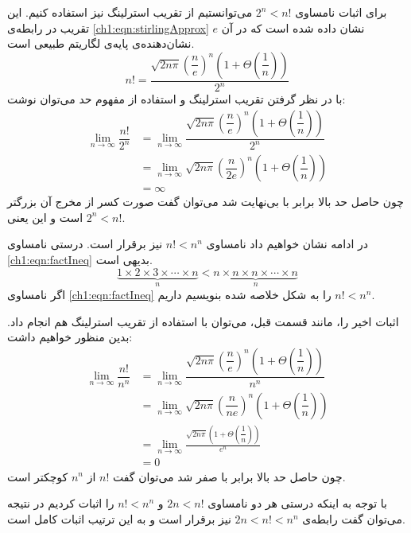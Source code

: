 برای اثبات نامساوی {$2^n < n!$} می‌توانستیم از تقریب استرلینگ نیز استفاده کنیم. این تقریب در رابطه‌ی {\eqref{ch1:eqn:stirlingApprox}} نشان داده شده است که در آن {$e$} نشان‌دهنده‌ی پایه‌ی لگاریتم طبیعی است.
\begin{equation}
n! = \dfrac{\sqrt{2n\pi}{\left( \dfrac{n}{e}\right)}^n\left( 1+\Theta\left(\dfrac{1}{n}\right)\right)}{2^n}\label{ch1:eqn:stirlingApprox}
\end{equation}
با در نظر گرفتن تقریب استرلینگ و استفاده از مفهوم حد می‌توان نوشت:
\begin{align*}
\lim_{n\to \infty} {\dfrac{n!}{2^n}} &=\lim_{n\to \infty}{\dfrac{\sqrt{2n\pi}{\left( \dfrac{n}{e}\right)}^n\left( 1+\Theta \left(\dfrac{1}{n}\right)\right)}{2^n}}\\
&=\lim_{n\to \infty}{ \sqrt{2n\pi}{\left( \dfrac{n}{2e}\right)}^n\left( 1+\Theta \left(\dfrac{1}{n}\right)\right)}\\
&= \infty
\end{align*}
چون حاصل حد بالا برابر با بی‌نهایت شد می‌توان گفت صورت کسر از مخرج آن بزرگتر است و این یعنی {$2^n < n!$}.

در ادامه نشان خواهیم داد نامساوی {$n! < n^n$} نیز برقرار است. درستی نامساوی {\eqref{ch1:eqn:factIneq}} بدیهی است.
\begin{equation}
\underbrace{1 \times 2\times 3 \times \cdots \times n}_{n} < \underbrace{ n \times n \times n \times \cdots \times n }_{n}\label{ch1:eqn:factIneq}
\end{equation}
اگر نامساوی {\eqref{ch1:eqn:factIneq}} را به شکل خلاصه ‌شده بنویسیم داریم {$n! < n^n$}.

اثبات اخیر را، مانند قسمت قبل، می‌توان با استفاده از تقریب استرلینگ هم انجام داد. بدین منظور خواهیم داشت:
\begin{align*}
\lim_{n\to \infty} {\dfrac{n!}{n^n}} &=\lim_{n\to \infty}{\dfrac{\sqrt{2n\pi}{\left( \dfrac{n}{e}\right)}^n\left( 1+\Theta \left(\dfrac{1}{n}\right)\right)}{n^n}}\\
&=\lim_{n\to \infty}{ \sqrt{2n\pi}{\left( \dfrac{n}{ne}\right)}^n\left( 1+\Theta\left(\dfrac{1}{n}\right)\right)}\\
&=\lim_{n\to \infty}{ \frac{\sqrt{2n\pi}\left( 1+\Theta\left(\dfrac{1}{n}\right)\right)}{e^n}}\\
&= 0
\end{align*}
چون حاصل حد بالا برابر با صفر شد می‌توان گفت {$n!$} از {$n^n$} کوچکتر است.

با توجه به اینکه درستی هر دو نامساوی  {$2n < n!$} و {$n! < n^n$} را اثبات کردیم در نتیجه می‌توان گفت رابطه‌ی {$2n < n! < n^n$} نیز برقرار است و به این ترتیب اثبات کامل است.

